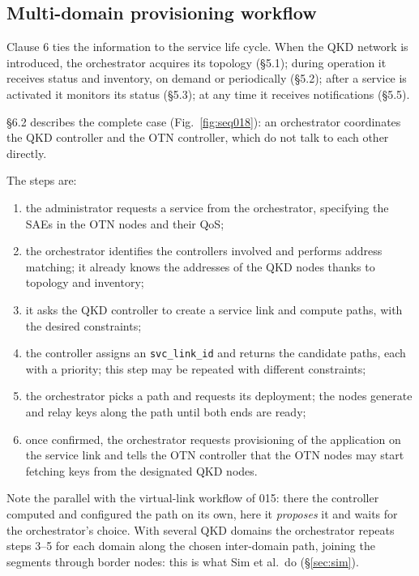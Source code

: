 \subsection{Multi-domain provisioning workflow}
\label{sec:workflow}

Clause 6 ties the information to the service life cycle. When the QKD
network is introduced, the orchestrator acquires its topology (§5.1);
during operation it receives status and inventory, on demand or
periodically (§5.2); after a service is activated it monitors its status
(§5.3); at any time it receives notifications (§5.5).

§6.2 describes the complete case (Fig.~\ref{fig:seq018}): an orchestrator
coordinates the QKD controller and the OTN controller, which do not talk to
each other directly.



The steps are:
\begin{enumerate}
  \item the administrator requests a service from the orchestrator,
        specifying the SAEs in the OTN nodes and their QoS;
  \item the orchestrator identifies the controllers involved and performs
        address matching; it already knows the addresses of the QKD nodes
        thanks to topology and inventory;
  \item it asks the QKD controller to create a service link and compute
        paths, with the desired constraints;
  \item the controller assigns an \texttt{svc\_link\_id} and returns the
        candidate paths, each with a priority; this step may be repeated
        with different constraints;
  \item the orchestrator picks a path and requests its deployment; the
        nodes generate and relay keys along the path until both ends are
        ready;
  \item once confirmed, the orchestrator requests provisioning of the
        application on the service link and tells the OTN controller that
        the OTN nodes may start fetching keys from the designated QKD
        nodes.
\end{enumerate}
Note the parallel with the virtual-link workflow of 015: there the
controller computed and configured the path on its own, here it
\emph{proposes} it and waits for the orchestrator's choice. With several
QKD domains the orchestrator repeats steps 3–5 for each domain along the
chosen inter-domain path, joining the segments through border nodes: this
is what Sim et al.\ do (§\ref{sec:sim}).

